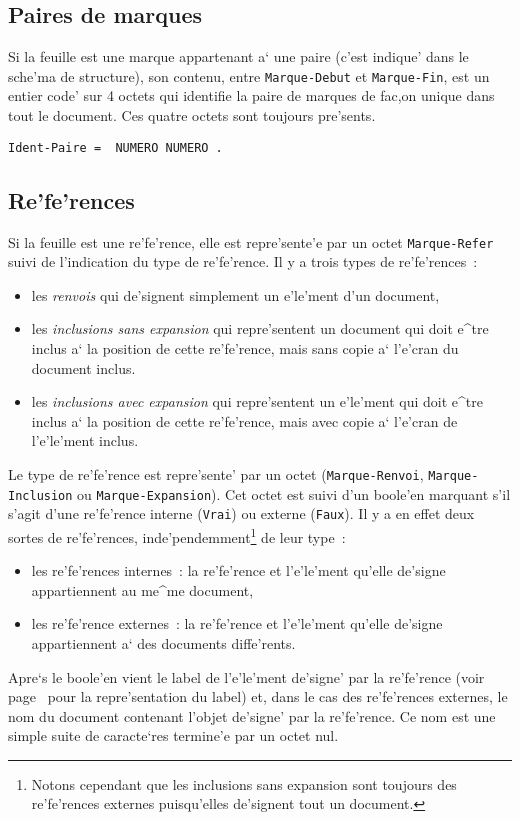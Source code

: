 \subsection{Paires de marques}
\label{paire}

Si la feuille est une marque appartenant a` une paire (c'est indique' dans
le sche'ma de structure), son contenu, entre {\tt Marque-Debut} et
{\tt Marque-Fin}, est un entier code' sur 4 octets qui identifie la paire
de marques de fac,on unique dans tout le document. Ces quatre octets
sont toujours pre'sents.

\begin{verbatim}
Ident-Paire =  NUMERO NUMERO .
\end{verbatim}

\subsection{Re'fe'rences}
\label{refer}

Si la feuille est une re'fe'rence, elle est repre'sente'e par un octet
{\tt Marque-Refer} suivi de l'indication du type de re'fe'rence.
Il y a trois types de re'fe'rences~:
\begin{itemize}
\item
les {\it renvois} qui de'signent simplement un e'le'ment d'un document,
\item
les {\it inclusions sans expansion} qui repre'sentent un document qui doit
e^tre inclus a` la position de cette re'fe'rence, mais sans copie a` l'e'cran
du document inclus.
\item
les {\it inclusions avec expansion} qui repre'sentent un e'le'ment qui doit
e^tre inclus a` la position de cette re'fe'rence, mais avec copie a` l'e'cran
de l'e'le'ment inclus.
\end{itemize}
Le type de re'fe'rence est repre'sente' par un octet ({\tt Marque-Renvoi},
{\tt Marque-Inclusion} ou {\tt Marque-Expansion}). Cet octet est suivi d'un
boole'en marquant s'il s'agit d'une re'fe'rence interne ({\tt Vrai}) ou
externe ({\tt Faux}).
Il y a en effet deux sortes de re'fe'rences, inde'pendemment\footnote{Notons
cependant que les inclusions sans expansion sont toujours des re'fe'rences
externes puisqu'elles de'signent tout un document.} de leur type~:
\begin{itemize}
\item
les re'fe'rences internes~: la re'fe'rence et l'e'le'ment qu'elle de'signe
appartiennent au me^me document,
\item
les re'fe'rence externes~: la re'fe'rence et l'e'le'ment qu'elle de'signe
appartiennent a` des documents diffe'rents.
\end{itemize}
Apre`s le boole'en vient le label de l'e'le'ment de'signe' par la re'fe'rence
(voir page~\pageref{label} pour la repre'sentation du label) et, dans le cas
des re'fe'rences externes, le nom du document contenant l'objet de'signe' par
la re'fe'rence. Ce nom est une simple suite de caracte`res termine'e par un
octet nul.

